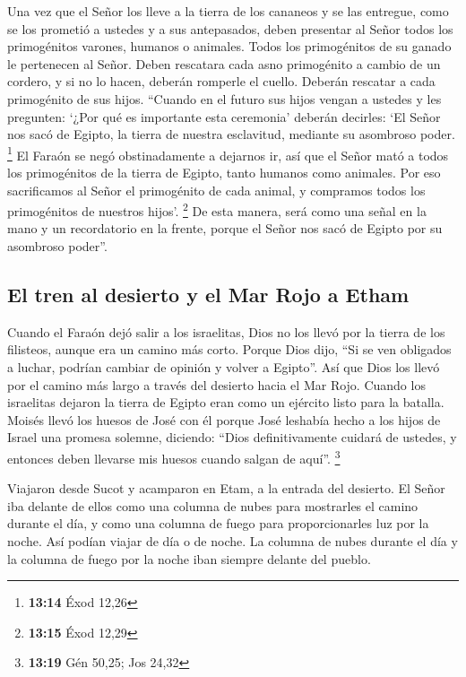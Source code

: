  Una vez que el Señor los lleve a la tierra de los
cananeos y se las entregue, como se los prometió a ustedes y a sus
antepasados,  deben presentar al Señor todos los
primogénitos varones, humanos o animales. Todos los primogénitos de su
ganado le pertenecen al Señor.  Deben rescatara cada asno
primogénito a cambio de un cordero, y si no lo hacen, deberán romperle
el cuello. Deberán rescatar a cada primogénito de sus hijos.
 ``Cuando en el futuro sus hijos vengan a ustedes y les
pregunten: `¿Por qué es importante esta ceremonia' deberán decirles: `El
Señor nos sacó de Egipto, la tierra de nuestra esclavitud, mediante su
asombroso poder. \footnote{\textbf{13:14} Éxod 12,26}  El
Faraón se negó obstinadamente a dejarnos ir, así que el Señor mató a
todos los primogénitos de la tierra de Egipto, tanto humanos como
animales. Por eso sacrificamos al Señor el primogénito de cada animal, y
compramos todos los primogénitos de nuestros hijos'. \footnote{\textbf{13:15}
  Éxod 12,29}  De esta manera, será como una señal en la
mano y un recordatorio en la frente, porque el Señor nos sacó de Egipto
por su asombroso poder''.

\hypertarget{el-tren-al-desierto-y-el-mar-rojo-a-etham}{%
\subsection{El tren al desierto y el Mar Rojo a
Etham}\label{el-tren-al-desierto-y-el-mar-rojo-a-etham}}

 Cuando el Faraón dejó salir a los israelitas, Dios no
los llevó por la tierra de los filisteos, aunque era un camino más
corto. Porque Dios dijo, ``Si se ven obligados a luchar, podrían cambiar
de opinión y volver a Egipto''.  Así que Dios los llevó
por el camino más largo a través del desierto hacia el Mar Rojo. Cuando
los israelitas dejaron la tierra de Egipto eran como un ejército listo
para la batalla.  Moisés llevó los huesos de José con él
porque José leshabía hecho a los hijos de Israel una promesa solemne,
diciendo: ``Dios definitivamente cuidará de ustedes, y entonces deben
llevarse mis huesos cuando salgan de aquí''. \footnote{\textbf{13:19}
  Gén 50,25; Jos 24,32}

 Viajaron desde Sucot y acamparon en Etam, a la entrada
del desierto.  El Señor iba delante de ellos como una
columna de nubes para mostrarles el camino durante el día, y como una
columna de fuego para proporcionarles luz por la noche. Así podían
viajar de día o de noche.  La columna de nubes durante el
día y la columna de fuego por la noche iban siempre delante del pueblo.

